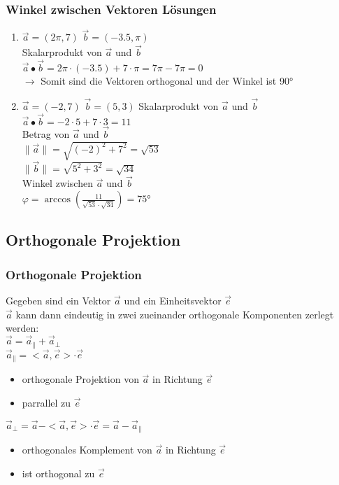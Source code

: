 \begin{frame}
	\frametitle{Winkel zwischen Vektoren Lösungen}
    \begin{enumerate}
        \item $\vec{a} = (2\pi, 7)$ $\vec{b} = (-3.5, \pi)$ \\
        Skalarprodukt von $\vec{a}$ und $\vec{b}$ \\
        $\vec{a} \bullet \vec{b} = 2\pi \cdot (-3.5) + 7 \cdot \pi = 7\pi - 7\pi = 0$ \\
        $\rightarrow$ Somit sind die Vektoren orthogonal und der Winkel ist 90° \\
        $ $ \\
        \item $\vec{a} = (-2, 7)$ $\vec{b} = (5, 3)$
        Skalarprodukt von $\vec{a}$ und $\vec{b}$ \\
        $\vec{a} \bullet \vec{b} = -2 \cdot 5 + 7 \cdot 3 = 11$ \\
        Betrag von $\vec{a}$ und $\vec{b}$ \\
        $\lVert \vec{a} \rVert = \sqrt{(-2)^2 + 7^2} = \sqrt{53}$ \\
        $\lVert \vec{b} \rVert = \sqrt{5^2 + 3^2} = \sqrt{34}$ \\
        Winkel zwischen $\vec{a}$ und $\vec{b}$ \\
        $\varphi = \arccos(\frac{11}{\sqrt{53} \cdot \sqrt{34}}) = 75$°
    \end{enumerate}
\end{frame}
		
\subsection{Orthogonale Projektion}
\begin{frame}
	\frametitle{Orthogonale Projektion}
	Gegeben sind ein Vektor $\vec{a}$ und ein Einheitsvektor $\vec{e}$\\
	$\vec{a}$ kann dann eindeutig in zwei zueinander orthogonale Komponenten zerlegt werden:\\
	$\vec{a} = \vec{a}_{\parallel} + \vec{a}_{\perp}$ \\
	$ $\\
	$\vec{a}_{\parallel} = < \vec{a}, \vec{e}> \cdot \vec{e}$ \\
	\begin{itemize}
		\item orthogonale Projektion von $\vec{a}$ in Richtung $\vec{e}$ 
		\item parrallel zu $\vec{e}$
	\end{itemize}
	$\vec{a}_{\perp} = \vec{a} - <\vec{a}, \vec{e}> \cdot \vec{e} = \vec{a} - \vec{a}_{\parallel}$
	\begin{itemize}
		\item orthogonales Komplement von $\vec{a}$ in Richtung $\vec{e}$
		\item ist orthogonal zu $\vec{e}$
	\end{itemize}
\end{frame}

